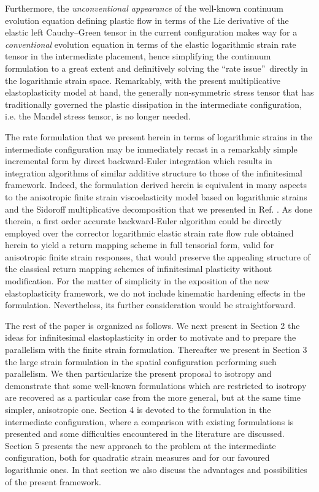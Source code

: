 \documentclass[preprint,review,12pt,sort&compress]{elsarticle}%
\begin{document}
Furthermore, the \emph{unconventional appearance} \cite{Simo92} of the
well-known continuum evolution equation defining plastic flow in terms of the
Lie derivative of the elastic left Cauchy--Green tensor in the current
configuration \cite{BonetWoodBook} makes way for a\emph{ conventional}
evolution equation in terms of the elastic logarithmic strain rate tensor in
the intermediate placement, hence simplifying the continuum formulation to a
great extent and definitively solving the \textquotedblleft rate
issue\textquotedblright\ directly in the logarithmic strain space. Remarkably,
with the present multiplicative elastoplasticity model at hand, the generally
non-symmetric stress tensor that has traditionally governed the plastic
dissipation in the intermediate configuration, i.e. the Mandel stress tensor,
is no longer needed.

The rate formulation that we present herein in terms of logarithmic strains in
the intermediate configuration may be immediately recast in a remarkably
simple incremental form by direct backward-Euler integration which results in
integration algorithms of similar additive structure to those of the
infinitesimal framework. Indeed, the formulation derived herein is equivalent
in many aspects to the anisotropic finite strain viscoelasticity model based
on logarithmic strains and the Sidoroff multiplicative decomposition that we
presented in Ref. \cite{LatMonCM2015}. As done therein, a first order accurate
backward-Euler algorithm could be directly employed over the corrector
logarithmic elastic strain rate flow rule obtained herein to yield a return
mapping scheme in full tensorial form, valid for anisotropic finite strain
responses, that would preserve the appealing structure of the classical return
mapping schemes of infinitesimal plasticity without modification. For the
matter of simplicity in the exposition of the new elastoplasticity framework,
we do not include kinematic hardening effects in the formulation.
Nevertheless, its further consideration would be straightforward.

The rest of the paper is organized as follows. We next present in Section 2
the ideas for infinitesimal elastoplasticity in order to motivate and to
prepare the parallelism with the finite strain formulation. Thereafter we
present in Section 3 the large strain formulation in the spatial configuration
performing such parallelism. We then particularize the present proposal to
isotropy and demonstrate that some well-known formulations which are
restricted to isotropy are recovered as a particular case from the more
general, but at the same time simpler, anisotropic one. Section 4 is devoted
to the formulation in the intermediate configuration, where a comparison with
existing formulations is presented and some difficulties encountered in the
literature are discussed. Section 5 presents the new approach to the problem
at the intermediate configuration, both for quadratic strain measures and for
our favoured logarithmic ones. In that section we also discuss the advantages
and possibilities of the present framework.
\end{document}
